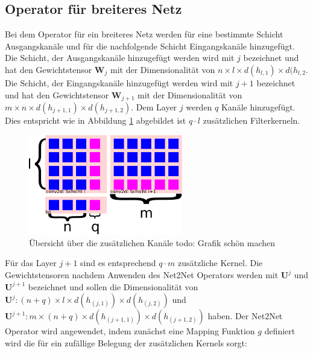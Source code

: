 \subsection{Operator für breiteres Netz}
Bei dem Operator für ein breiteres Netz werden für eine bestimmte Schicht Ausgangskanäle und für die nachfolgende Schicht Eingangskanäle hinzugefügt. Die Schicht, der Ausgangskanäle hinzugefügt werden wird mit $j$ bezeichnet und hat den Gewichtstensor $\mathbf{W}_j$ mit der Dimensionalität von $n \times l \times d(h_{l,1}) \times d(h_{l,2}$. Die Schicht, der Eingangskanäle hinzugefügt werden wird mit $j+1$ bezeichnet und hat den Gewichtstensor $\mathbf{W}_{j+1}$ mit der Dimensionalität von $m \times n \times d(h_{j+1,1}) \times d(h_{j+1,2})$. Dem Layer $j$ werden $q$ Kanäle hinzugefügt. Dies entspricht wie in Abbildung \ref{abb:channels} abgebildet ist $q \cdot l $ zusätzlichen Filterkerneln. 
\begin{figure}[h]
 \centering
 \includegraphics[width=0.6\textwidth]{KapitelPartA/images/channels.png}
 \caption{Übersicht über die zusätzlichen Kanäle todo: Grafik schön machen}
\label{abb:channels}
 \end{figure}



Für das Layer $j+1$ sind es entsprechend $q \cdot m $ zusätzliche Kernel. Die Gewichtstensoren nachdem Anwenden des Net2Net Operators werden mit $\mathbf{U}^j$ und $\mathbf{U}^{j+1}$ bezeichnet und sollen die Dimensionalität von $\mathbf{U}^j: (n+q) \times l \times d(h_{(j,1)}) \times d(h_{(j,2)})$ und $\mathbf{U}^{j+1}: m \times (n+q) \times d(h_{(j+1,1)}) \times d(h_{(j+1,2)})$ haben. Der Net2Net Operator wird angewendet, indem zunächst eine Mapping Funktion $g$ definiert wird die für ein zufällige Belegung der zusätzlichen Kernels sorgt:

